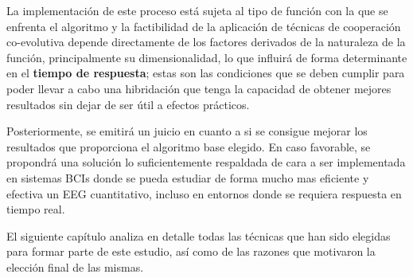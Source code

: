 La implementación de este proceso está sujeta al tipo de función con la que se enfrenta el algoritmo y la factibilidad de la aplicación de técnicas de cooperación co-evolutiva depende directamente de los factores derivados de la naturaleza de la función, principalmente su dimensionalidad, lo que influirá de forma determinante en el \textbf{tiempo de respuesta}; estas son las condiciones que se deben cumplir para poder llevar a cabo una hibridación que tenga la capacidad de obtener mejores resultados sin dejar de ser útil a efectos prácticos.

Posteriormente, se emitirá un juicio en cuanto a si se consigue mejorar los resultados que proporciona el algoritmo base elegido. En caso favorable, se propondrá una solución lo suficientemente respaldada de cara a ser implementada en sistemas BCIs donde se pueda estudiar de forma mucho mas eficiente y efectiva un EEG cuantitativo, incluso en entornos donde se requiera respuesta en tiempo real.

El siguiente capítulo analiza en detalle todas las técnicas que han sido elegidas para formar parte de este estudio, así como de las razones que motivaron la elección final de las mismas.

